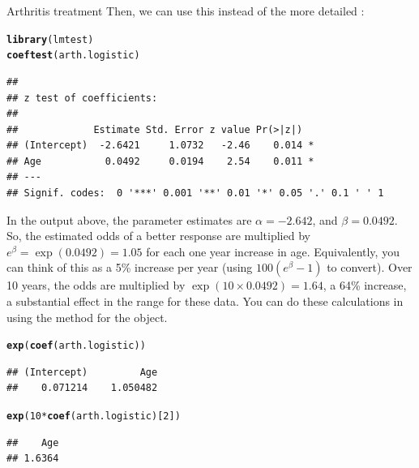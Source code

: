 \documentclass[11pt]{book}\usepackage[]{graphicx}\usepackage[]{color}
\makeatletter
\newcommand{\hlnum}[1]{\textcolor[rgb]{0.686,0.059,0.569}{#1}}%
\newcommand{\hlopt}[1]{\textcolor[rgb]{0,0,0}{#1}}%
\newcommand{\hlstd}[1]{\textcolor[rgb]{0.345,0.345,0.345}{#1}}%
\newcommand{\hlkwd}[1]{\textcolor[rgb]{0.737,0.353,0.396}{\textbf{#1}}}%
\newenvironment{kframe}{%
 \def\at@end@of@kframe{}%
 \ifinner\ifhmode%
  \def\at@end@of@kframe{\end{minipage}}%
  \begin{minipage}{\columnwidth}%
 \fi\fi%
 \def\FrameCommand##1{\hskip\@totalleftmargin \hskip-\fboxsep
 \colorbox{shadecolor}{##1}\hskip-\fboxsep
     \hskip-\linewidth \hskip-\@totalleftmargin \hskip\columnwidth}%
 \MakeFramed {\advance\hsize-\width
   \@totalleftmargin\z@ \linewidth\hsize
   \@setminipage}}%
 {\par\unskip\endMakeFramed%
 \at@end@of@kframe}
\newenvironment{knitrout}{}{} %
\renewenvironment{knitrout}{\small\renewcommand{\baselinestretch}{.85}}{} %
\makeatother
\begin{document}
\begin{Example}[arthrit6]{Arthritis treatment}
Then, we can use this instead of the more detailed :
\begin{knitrout}
\color{fgcolor}\begin{kframe}
\begin{alltt}
\hlkwd{library}\hlstd{(lmtest)}
\hlkwd{coeftest}\hlstd{(arth.logistic)}
\end{alltt}
\begin{verbatim}
## 
## z test of coefficients:
## 
##             Estimate Std. Error z value Pr(>|z|)  
## (Intercept)  -2.6421     1.0732   -2.46    0.014 *
## Age           0.0492     0.0194    2.54    0.011 *
## ---
## Signif. codes:  0 '***' 0.001 '**' 0.01 '*' 0.05 '.' 0.1 ' ' 1
\end{verbatim}
\end{kframe}
\end{knitrout}


In the output above, the parameter estimates
are $\alpha = -2.642$, and $\beta = 0.0492$.  So, the estimated odds of
a better response are multiplied by $e^{\beta} = \exp(0.0492) = 1.05$
for each one year increase in age.  Equivalently, you can think of this
as a 5\% increase per year (using $100 (e^{\beta} -1)$ to convert).
Over 10 years, the odds are multiplied by $\exp(10 \times 0.0492) = 1.64$,
a 64\% increase, a substantial effect in the range for these data.
You can do these calculations in \R using the  method for the  object.
\begin{knitrout}
\color{fgcolor}\begin{kframe}
\begin{alltt}
\hlkwd{exp}\hlstd{(}\hlkwd{coef}\hlstd{(arth.logistic))}
\end{alltt}
\begin{verbatim}
## (Intercept)         Age 
##    0.071214    1.050482
\end{verbatim}
\begin{alltt}
\hlkwd{exp}\hlstd{(}\hlnum{10}\hlopt{*}\hlkwd{coef}\hlstd{(arth.logistic)[}\hlnum{2}\hlstd{])}
\end{alltt}
\begin{verbatim}
##    Age 
## 1.6364
\end{verbatim}
\end{kframe}
\end{knitrout}


\end{Example}
\end{document}
